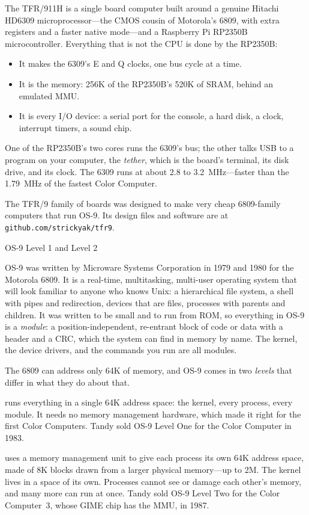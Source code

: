 \documentclass[10pt,twoside,openany]{book}
\makeatletter
\newcommand{\file}[1]{\texttt{#1}}           %
\newcommand{\sans}[1]{\textsf{#1}}
\renewcommand{\section}{\@startsection{section}{1}{0pt}{3.2ex plus 1ex}{1.2ex}%
  {\sffamily\bfseries\large}}
\makeatother
\begin{document}
The TFR/911H is a single board computer built around a genuine Hitachi
HD6309 microprocessor---the CMOS cousin of Motorola's 6809, with extra
registers and a faster native mode---and a Raspberry Pi RP2350B
microcontroller. Everything that is not the CPU is done by the RP2350B:
\begin{itemize}\setlength{\itemsep}{0pt}
\item It makes the 6309's E and Q clocks, one bus cycle at a time.
\item It is the memory: 256K of the RP2350B's 520K of SRAM, behind an
emulated MMU.
\item It is every I/O device: a serial port for the console, a hard disk,
a clock, interrupt timers, a sound chip.
\end{itemize}
One of the RP2350B's two cores runs the 6309's bus; the other talks USB
to a program on your computer, the \emph{tether}, which is the board's
terminal, its disk drive, and its clock. The 6309 runs at about 2.8 to
3.2~MHz---faster than the 1.79~MHz of the fastest Color Computer.

The TFR/9 family of boards was designed to make very cheap 6809-family
computers that run OS-9. Its design files and software are at
\file{github.com/strickyak/tfr9}.

\section{OS-9 Level 1 and Level 2}

OS-9 was written by Microware Systems Corporation in 1979 and 1980 for
the Motorola 6809. It is a real-time, multitasking, multi-user operating
system that will look familiar to anyone who knows Unix: a hierarchical
file system, a shell with pipes and redirection, devices that are files,
processes with parents and children. It was written to be small and to
run from ROM, so everything in OS-9 is a \emph{module}: a
position-independent, re-entrant block of code or data with a header and
a CRC, which the system can find in memory by name. The kernel, the
device drivers, and the commands you run are all modules.

The 6809 can address only 64K of memory, and OS-9 comes in two
\emph{levels} that differ in what they do about that.

\begin{description}\setlength{\itemsep}{0.5ex}
\item[\sans{Level 1}] runs everything in a single 64K address space: the
kernel, every process, every module. It needs no memory management
hardware, which made it right for the first Color Computers. Tandy sold
OS-9 Level One for the Color Computer in 1983.

\item[\sans{Level 2}] uses a memory management unit to give each process
its own 64K address space, made of 8K blocks drawn from a larger physical
memory---up to 2M. The kernel lives in a space of its own. Processes cannot
see or damage each other's memory, and many more can run at once. Tandy
sold OS-9 Level Two for the Color Computer~3, whose GIME chip has the
MMU, in 1987.
\end{description}
\end{document}
